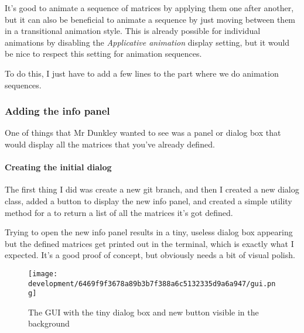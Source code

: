 \documentclass[../development.tex]{subfiles}
\begin{document}
It's good to animate a sequence of matrices by applying them one after another, but it can also be beneficial to animate a sequence by just moving between them in a transitional animation style. This is already possible for individual animations by disabling the \textit{Applicative animation} display setting, but it would be nice to respect this setting for animation sequences.

To do this, I just have to add a few lines to the part where we do animation sequences.


\subsubsection{Adding the info panel\label{development:teacher-suggestions:adding-the-info-panel}}

One of things that Mr Dunkley wanted to see was a panel or dialog box that would display all the matrices that you've already defined.

\paragraph{Creating the initial dialog\label{development:teacher-suggestions:adding-the-info-panel:creating-the-initial-dialog}}

The first thing I did was create a new git branch, and then I created a new dialog class, added a button to display the new info panel, and created a simple utility method for a  to return a list of all the matrices it's got defined.




Trying to open the new info panel results in a tiny, useless dialog box appearing but the defined matrices get printed out in the terminal, which is exactly what I expected. It's a good proof of concept, but obviously needs a bit of visual polish.

\begin{figure}[H]
	\centering
	\texttt{[image: development/6469f9f3678a89b3b7f388a6c5132335d9a6a947/gui.png]}
	\caption{The GUI with the tiny dialog box and new button visible in the background}
	\label{fig:development:6469f9f3678a89b3b7f388a6c5132335d9a6a947:gui.png}
\end{figure}
\end{document}
